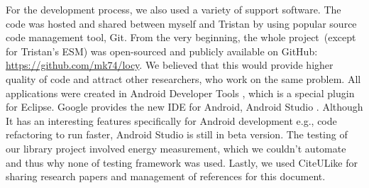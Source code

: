 For the development process, we also used a variety of support software. The code was hosted and shared between myself and Tristan by using popular source code management tool, Git. From the very beginning, the whole project\ (except for Tristan's ESM) was open-sourced and publicly available on GitHub: \url{https://github.com/mk74/locy}. We believed that this would provide higher quality of code and attract other researchers, who work on the same problem. All applications were created in Android Developer Tools \cite{google:adt}, which is a special plugin for Eclipse. Google provides the new IDE for Android, Android Studio \cite{google:androidstudio}. Although It has an interesting features specifically for Android development e.g., code refactoring to run faster, Android Studio is still in beta version. The testing of our library project involved energy measurement, which we couldn't automate and thus why none of testing framework was used. Lastly, we used CiteULike for sharing research papers and management of references for this document.
	